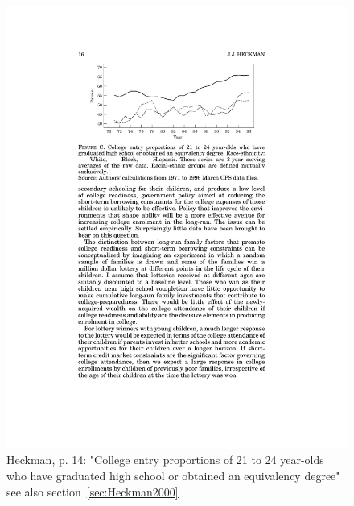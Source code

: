 \documentclass[12pt,a4paper]{article}
\begin{document}
    \begin{figure}[ht]
      \centering
      \includegraphics[width=12cm]{Meeting 10 Policies to foster human capital - Seite 14.pdf}
      \caption{Heckman, p. 14: "College entry proportions of 21 to 24 year-olds who have graduated high school or obtained an equivalency degree" see also section~\ref{sec:Heckman2000}}
      \label{fig:Heckman collegeentry}
    \end{figure}
\end{document}
